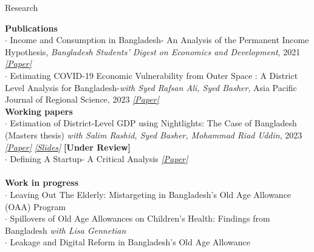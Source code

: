 \documentclass[
	9pt %
]{resume} %
\begin{document}

\vspace{-10pt}
\begin{rSection}{Research}

\textbf{Publications} \\
$\cdot$ Income and Consumption in Bangladesh- An Analysis of the Permanent Income Hypothesis, \textit{Bangladesh Students’ Digest on Economics and Development}, 2021 \textit{\href{https://www.researchgate.net/publication/358138834_Income_and_Consumption_in_Bangladesh-An_Analysis_of_the_Permanent_Income_Hypothesis}{[Paper]}} \\
$\cdot$ Estimating COVID-19 Economic Vulnerability from Outer Space : A District Level Analysis for Bangladesh-\textit{with Syed Rafsan Ali, Syed Basher}, Asia Pacific Journal of Regional Science, 2023 \textit{\href{https://papers.ssrn.com/sol3/papers.cfm?abstract_id=4589298}{[Paper]}} \\

\vspace{-6pt}
\textbf{Working papers} \\
$\cdot$ Estimation of District-Level GDP using Nightlights: The Case of Bangladesh (Masters thesis) \textit{with Salim Rashid, Syed Basher, Mohammad Riad Uddin}, 2023
\textit{\href{https://papers.ssrn.com/sol3/papers.cfm?abstract_id=4373887}{[Paper]}}
\textit{\href{https://drive.google.com/file/d/1Fcz9kcQH-0bsl6-8REYTjoXooL8vKHHT/view}{[Slides]}}
\textbf{[Under Review]} \\
$\cdot$ Defining A Startup- A Critical Analysis \textit{\href{https://papers.ssrn.com/sol3/papers.cfm?abstract_id=3823361}{[Paper]}} \\
\\
\vspace{-1pt}
\textbf{Work in progress} \\
$\cdot$ Leaving Out The Elderly: Mistargeting in Bangladesh’s Old Age Allowance (OAA) Program\\
$\cdot$ Spillovers of Old Age Allowances on Children’s Health: Findings from Bangladesh \textit{with Lisa Gennetian} \\
$\cdot$ Leakage and Digital Reform in Bangladesh’s Old Age Allowance


\end{rSection}

\end{document}
